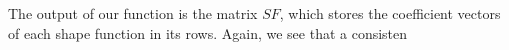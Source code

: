 \documentclass[a4paper,12pt]{article}
\begin{document}
The output of our function is the matrix $SF$, which stores the coefficient vectors of each shape function in its rows. Again, we see that a consisten
\end{document}
